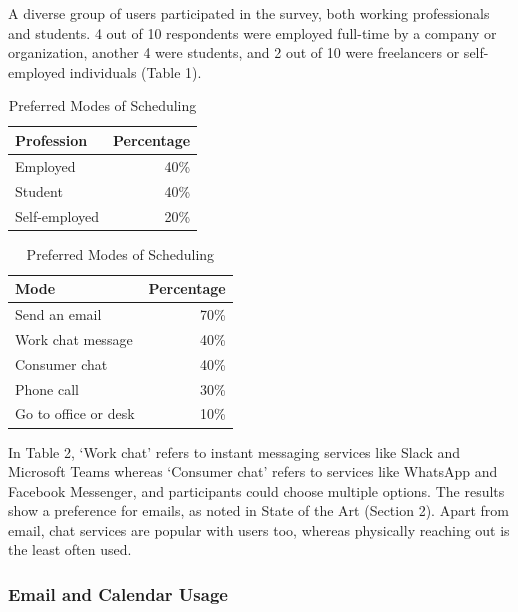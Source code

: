 \documentclass{article}
\begin{document}
A diverse group of users participated in the survey, both working professionals and students. 4 out of 10 respondents were employed full-time by a company or organization, another 4 were students, and 2 out of 10 were freelancers or self-employed individuals (Table 1).

\begin{table}[!htb]
	\begin{minipage}{.5\linewidth}
		\caption{Professions of Participants}
		\centering
		\begin{tabular}{lr}
			\hline
			\textbf{Profession} & \textbf{Percentage} \\
			\hline
			Employed            & 40\%                \\
			Student             & 40\%                \\
			Self-employed       & 20\%                \\
			\hline
		\end{tabular}
	\end{minipage}%
	\hspace{.1cm}
	\begin{minipage}{.5\linewidth}
		\centering
		\caption{Preferred Modes of Scheduling}
		\begin{tabular}{lr}
			\hline
			\textbf{Mode}        & \textbf{Percentage} \\
			\hline
			Send an email        & 70\%                \\
			Work chat message    & 40\%                \\
			Consumer chat        & 40\%                \\
			Phone call           & 30\%                \\
			Go to office or desk & 10\%                \\
			\hline
		\end{tabular}
	\end{minipage} 
\end{table}

In Table 2, `Work chat' refers to instant messaging services like Slack and Microsoft Teams whereas `Consumer chat' refers to services like WhatsApp and Facebook Messenger, and participants could choose multiple options. The results show a preference for emails, as noted in State of the Art (Section 2). Apart from email, chat services are popular with users too, whereas physically reaching out is the least often used.

\subsubsection{Email and Calendar Usage}
\end{document}
